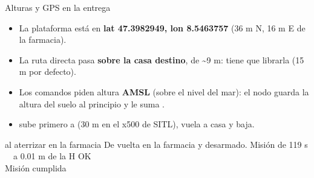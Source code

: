 \begin{frame}{Alturas y GPS en la entrega}
  \small
  \begin{itemize}
    \item La plataforma está en \textbf{lat 47.3982949, lon 8.5463757} (36 m N, 16 m E de la farmacia).
    \item La ruta directa pasa \textbf{sobre la casa destino}, de \textasciitilde9 m: 
      tiene que librarla (15 m por defecto).
    \item Los comandos piden altura \textbf{AMSL} (sobre el nivel del mar): el nodo guarda la altura del
      suelo al principio y le suma .
    \item {} sube primero a  (30 m en el x500 de SITL), vuela a casa y baja.
  \end{itemize}
  \begin{terminal}{al aterrizar en la farmacia}
De vuelta en la farmacia y desarmado. Misión de 119 s\\
\ \ a 0.01 m de la H OK\\
Misión cumplida
  \end{terminal}
\end{frame}
